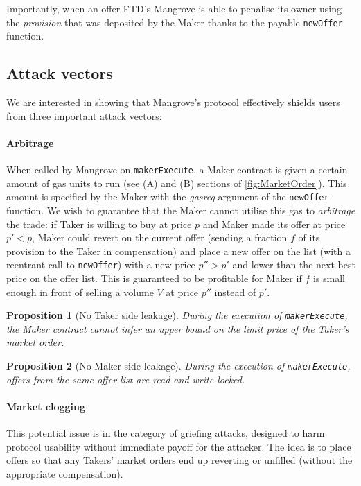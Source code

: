 \documentclass[12pt]{extarticle}
\newtheorem{proposition}{Proposition}
\begin{document}
Importantly, when an offer FTD's Mangrove is able to penalise its owner using the \emph{provision} that was deposited by the Maker thanks to the payable \texttt{newOffer} function.

\subsection{Attack vectors}\label{sec:attacks}

We are interested in showing that Mangrove's protocol effectively shields users from three important attack vectors:

\paragraph{Arbitrage}
When called by Mangrove on {\tt makerExecute}, a Maker contract is given a certain amount of gas units to run (see (A) and (B) sections of \autoref{fig:MarketOrder}). This amount is specified by the Maker with the \emph{gasreq} argument of the {\tt newOffer} function. We wish to guarantee that the Maker cannot utilise this gas to \emph{arbitrage} the trade: if Taker is willing to buy at price $p$ and Maker made its offer at price $p'<p$, Maker could revert on the current offer (sending a fraction $f$ of its provision to the Taker in compensation) and place a new offer on the list (with a reentrant call to {\tt newOffer}) with a new price $p''>p'$ and lower than the next best price on the offer list. This is guaranteed to be profitable for Maker if $f$ is small enough in front of selling a volume $V$ at price $p''$ instead of $p'$.
\begin{proposition}[No Taker side leakage]
During the execution of {\rm\texttt{makerExecute}}, the Maker contract cannot infer an upper bound on the limit price of the Taker's market order.
\end{proposition}

\begin{proposition}[No Maker side leakage]
During the execution of {\rm\texttt{makerExecute}}, offers from the same offer list are read and write locked.
\end{proposition}

\paragraph{Market clogging}
This potential issue is in the category of griefing attacks, designed to harm protocol usability without immediate payoff for the attacker. The idea is to place offers so that any Takers' market orders end up reverting or unfilled (without the appropriate compensation).    
\end{document}

